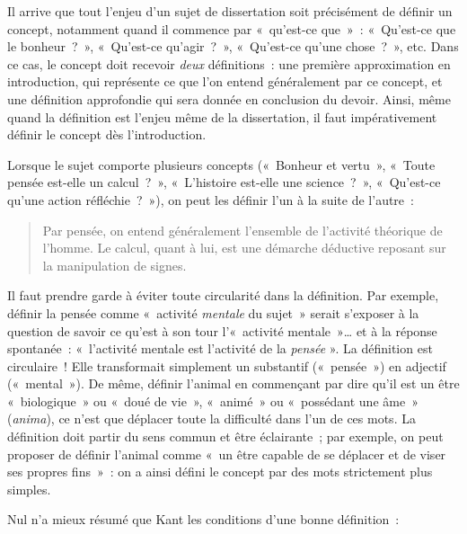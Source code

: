 \documentclass[a4paper]{article}
\begin{document}
Il arrive que tout l'enjeu d'un sujet de dissertation soit précisément
de définir un concept, notamment quand il commence par « qu'est-ce que » :
« Qu'est-ce que le bonheur ? », « Qu'est-ce qu'agir ? », « Qu'est-ce qu'une
chose ? », etc. Dans ce cas, le concept doit recevoir \emph{deux}
définitions : une première approximation en introduction, qui représente
ce que l'on entend généralement par ce concept, et une définition
approfondie qui sera donnée en conclusion du devoir. Ainsi, même quand
la définition est l'enjeu même de la dissertation, il faut
impérativement définir le concept dès l'introduction.

Lorsque le sujet comporte plusieurs concepts (« Bonheur et vertu », « Toute
pensée est-elle un calcul ? », « L'histoire est-elle une science ? »,
« Qu'est-ce qu'une action réfléchie ? »), on peut les définir l'un à la
suite de l'autre :

\begin{quote}
Par pensée, on entend généralement l'ensemble de l'activité théorique
de l'homme. Le calcul, quant à lui, est une démarche déductive
reposant sur la manipulation de signes.
\end{quote}

Il faut prendre garde à éviter toute circularité dans la définition. Par
exemple, définir la pensée comme « activité \emph{mentale} du sujet » serait
s'exposer à la question de savoir ce qu'est à son tour l'« activité
mentale »\ldots{} et à la réponse spontanée : « l'activité mentale est
l'activité de la \emph{pensée} ». La définition est circulaire ! Elle
transformait simplement un substantif (« pensée ») en adjectif (« mental »).
De même, définir l'animal en commençant par dire qu'il est un être
« biologique » ou « doué de vie », « animé » ou « possédant une âme » (\emph{anima}),
ce n'est que déplacer toute la difficulté dans l'un de ces mots. La
définition doit partir du sens commun et être éclairante ; par exemple,
on peut proposer de définir l'animal comme « un être capable de se
déplacer et de viser ses propres fins » : on a ainsi défini le concept
par des mots strictement plus simples.

Nul n'a mieux résumé que Kant les conditions d'une bonne définition :
\end{document}
